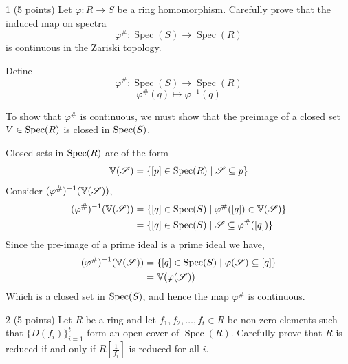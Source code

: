 \documentclass[12pt]{article}
\begin{document}


\begin{problem}{1 (5 points)}
Let $\varphi : R \to S$ be a ring homomorphism. Carefully prove that the induced map on spectra
\[\varphi^\# : \operatorname{Spec}(S) \to \operatorname{Spec}(R)\]
is continuous in the Zariski topology.
\end{problem}

\begin{solution}
    \bbni

    Define 
    \[\varphi^\# : \operatorname{Spec}(S) \to \operatorname{Spec}(R)\]
    \[\varphi^\# (q) \mapsto \varphi^{-1}(q)\]

    To show that $\varphi^{\#}$ is continuous, we must show that the preimage of a closed set $V \in \operatorname{Spec}(R)$ is closed in $\operatorname{Spec}(S)$. 
    

    Closed sets in $\operatorname{Spec}(R)$ are of the form 
    \[\mathbb V(\operatorname{\mathscr S}) = \{[p] \in \operatorname{Spec}(R) \mid \operatorname{\mathscr S} \subseteq p\}\]
    Consider $(\varphi^\#)^{-1}(\mathbb V(\operatorname{\mathscr S}))$, 
    \begin{align*}
        (\varphi^\#)^{-1}(\mathbb V(\operatorname{\mathscr S})) &= \{[q] \in \operatorname{Spec}(S) \mid \varphi^{\#}([q]) \in \mathbb V(\operatorname{\mathscr S})\} \\ 
        &= \{[q] \in \operatorname{Spec}(S) \mid \operatorname{\mathscr S} \subseteq \varphi^{\#}([q])\} 
    \end{align*}
    Since the pre-image of a prime ideal is a prime ideal we have,
    \begin{align*}
        (\varphi^\#)^{-1}(\mathbb V(\operatorname{\mathscr S})) &= \{[q] \in \operatorname{Spec}(S) \mid \varphi(\operatorname{\mathscr S}) \subseteq [q]\} \\
        &= \mathbb V(\varphi(\operatorname{\mathscr S}))
    \end{align*}
    Which is a closed set in $\operatorname{Spec}(S)$, and hence the map $\varphi^{\#}$ is continuous. 
\end{solution}

\newpage

\begin{problem}{2 (5 points)}
Let $R$ be a ring and let $f_1, f_2, \dots, f_t \in R$ be non-zero elements such that $\{D(f_i)\}_{i=1}^t$ form
an open cover of $\operatorname{Spec}(R)$. Carefully prove that $R$ is reduced if and only if $R\!\left[\frac{1}{f_i}\right]$ is reduced for all $i$.
\end{problem}
\end{document}
